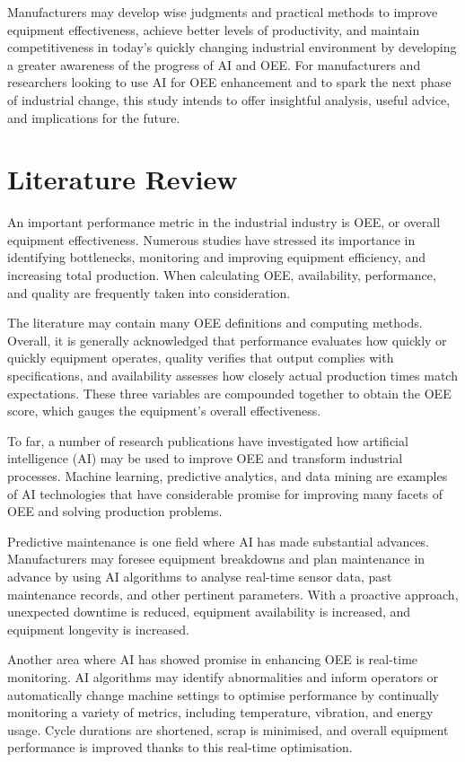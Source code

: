 \documentclass[12pt]{article}
\begin{document}
Manufacturers may develop wise judgments and practical methods to improve equipment effectiveness, achieve better levels of productivity, and maintain competitiveness in today's quickly changing industrial environment by developing a greater awareness of the progress of AI and OEE. For manufacturers and researchers looking to use AI for OEE enhancement and to spark the next phase of industrial change, this study intends to offer insightful analysis, useful advice, and implications for the future.

\section{Literature Review}
An important performance metric in the industrial industry is OEE, or overall equipment effectiveness. Numerous studies have stressed its importance in identifying bottlenecks, monitoring and improving equipment efficiency, and increasing total production. When calculating OEE, availability, performance, and quality are frequently taken into consideration.

The literature may contain many OEE definitions and computing methods. Overall, it is generally acknowledged that performance evaluates how quickly or quickly equipment operates, quality verifies that output complies with specifications, and availability assesses how closely actual production times match expectations. These three variables are compounded together to obtain the OEE score, which gauges the equipment's overall effectiveness.


To far, a number of research publications have investigated how artificial intelligence (AI) may be used to improve OEE and transform industrial processes. Machine learning, predictive analytics, and data mining are examples of AI technologies that have considerable promise for improving many facets of OEE and solving production problems.

Predictive maintenance is one field where AI has made substantial advances. Manufacturers may foresee equipment breakdowns and plan maintenance in advance by using AI algorithms to analyse real-time sensor data, past maintenance records, and other pertinent parameters. With a proactive approach, unexpected downtime is reduced, equipment availability is increased, and equipment longevity is increased.


Another area where AI has showed promise in enhancing OEE is real-time monitoring. AI algorithms may identify abnormalities and inform operators or automatically change machine settings to optimise performance by continually monitoring a variety of metrics, including temperature, vibration, and energy usage. Cycle durations are shortened, scrap is minimised, and overall equipment performance is improved thanks to this real-time optimisation.
\end{document}
